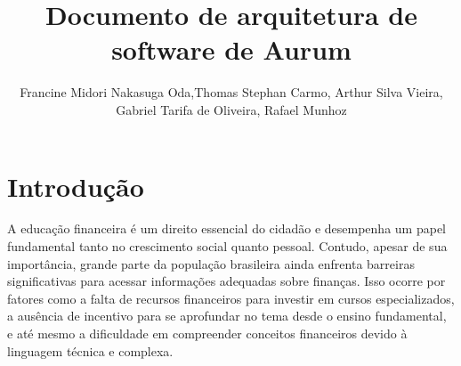 \documentclass[
	article,			%
	12pt,				%
	oneside,			%
	a4paper,			%
	english,			%
	brazil,				%
	sumario=tradicional
	]{abntex2}
\title{Documento de arquitetura de software de Aurum}
\author{Francine Midori Nakasuga Oda\inst{1},Thomas Stephan Carmo\inst{1}, Arthur Silva Vieira\inst{1},\\ Gabriel Tarifa de Oliveira\inst{1}, Rafael Munhoz\inst{1} }
\begin{document}


\frenchspacing 


%
%

\maketitle







\textual

\section{Introdução}

A educação financeira é um direito essencial do cidadão e desempenha um papel fundamental tanto no crescimento social quanto pessoal. Contudo, apesar de sua importância, grande parte da população brasileira ainda enfrenta barreiras significativas para acessar informações adequadas sobre finanças. Isso ocorre por fatores como a falta de recursos financeiros para investir em cursos especializados, a ausência de incentivo para se aprofundar no tema desde o ensino fundamental, e até mesmo a dificuldade em compreender conceitos financeiros devido à linguagem técnica e complexa.
\end{document}
